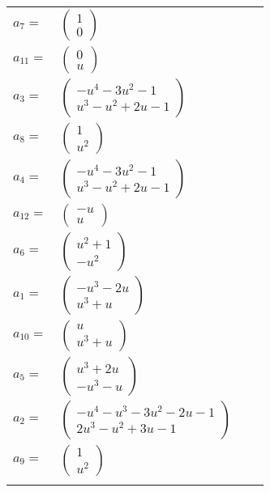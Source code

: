 \documentclass[1p]{elsarticle_modified}
\theoremstyle{definition}
\begin{document}
\begin{tabular}{m{7pt} m{180pt} m{7pt} m{180pt} }
\flushright $a_{7}=$&$\begin{pmatrix}1\\0\end{pmatrix}$ \\
\flushright $a_{11}=$&$\begin{pmatrix}0\\u\end{pmatrix}$ \\
\flushright $a_{3}=$&$\begin{pmatrix}- u^4-3 u^2-1\\u^3- u^2+2 u-1\end{pmatrix}$ \\
\flushright $a_{8}=$&$\begin{pmatrix}1\\u^2\end{pmatrix}$ \\
\flushright $a_{4}=$&$\begin{pmatrix}- u^4-3 u^2-1\\u^3- u^2+2 u-1\end{pmatrix}$ \\
\flushright $a_{12}=$&$\begin{pmatrix}- u\\u\end{pmatrix}$ \\
\flushright $a_{6}=$&$\begin{pmatrix}u^2+1\\- u^2\end{pmatrix}$ \\
\flushright $a_{1}=$&$\begin{pmatrix}- u^3-2 u\\u^3+u\end{pmatrix}$ \\
\flushright $a_{10}=$&$\begin{pmatrix}u\\u^3+u\end{pmatrix}$ \\
\flushright $a_{5}=$&$\begin{pmatrix}u^3+2 u\\- u^3- u\end{pmatrix}$ \\
\flushright $a_{2}=$&$\begin{pmatrix}- u^4- u^3-3 u^2-2 u-1\\2 u^3- u^2+3 u-1\end{pmatrix}$ \\
\flushright $a_{9}=$&$\begin{pmatrix}1\\u^2\end{pmatrix}$\\&\end{tabular}
\end{document}
